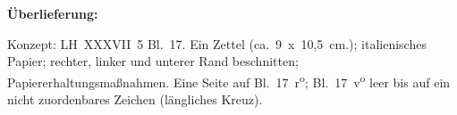 %  
%			
%
%
%
\frenchspacing
%
\begin{ledgroupsized}[r]{120mm}
\footnotesize
\pstart
\noindent\textbf{Überlieferung:}
\pend
\end{ledgroupsized}
%
\begin{ledgroupsized}[r]{114mm}
\footnotesize
\pstart \parindent -6mm
%
Konzept: LH~XXXVII~5 Bl.~17.
Ein Zettel (ca.~9~x~10,5~cm.);
italienisches Papier;
rechter, linker und unterer Rand beschnitten; Papiererhaltungsmaßnahmen.
Eine Seite auf Bl.~17~r\textsuperscript{o};
Bl.~17~v\textsuperscript{o} leer bis auf ein nicht zuordenbares Zeichen (längliches Kreuz).
\pend
\end{ledgroupsized}
%
%
\vspace{5mm}
